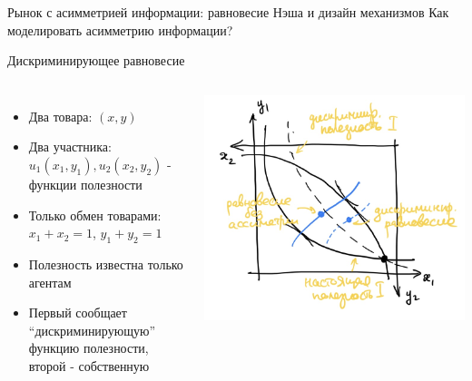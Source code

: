 \documentclass{beamer}
\begin{document}
\begin{frame}{Рынок с асимметрией информации: равновесие Нэша и дизайн механизмов}
  \centering
\Large Как моделировать асимметрию информации? 
\end{frame}

\begin{frame}{Дискриминирующее равновесие}

\begin{columns}
\begin{itemize}
    \item Два товара: $(x,y)$
    \item Два участника: $u_1(x_1,y_1), u_2(x_2,y_2)$ - функции полезности 
    \item Только обмен товарами: $x_1 + x_2 = 1$,  $y_1 + y_2 = 1$
    \item Полезность известна только агентам
    \item Первый сообщает ``дискриминирующую'' функцию полезности, второй - собственную
\end{itemize}



        \includegraphics[width=1.0\textwidth]{2_figs/as.jpeg}


\end{columns}
\end{frame}
\end{document}
